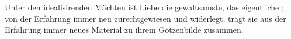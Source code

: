 Unter den idealisirenden Mächten ist Liebe die gewaltsamste, das eigentliche ; von der Erfahrung immer neu zurechtgewiesen und widerlegt, trägt sie aus der Erfahrung immer neues Material zu ihrem Götzenbilde zusammen.
\par

